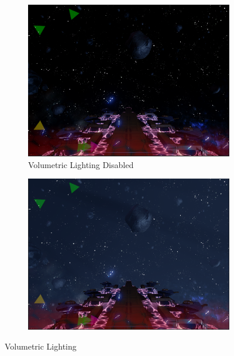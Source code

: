 \documentclass[a4paper,11pt]{article}
\begin{document}
\begin{figure}[ht]
	\centering
    
    \begin{subfigure}{.5\textwidth}
      \centering
      \includegraphics[width=.97\textwidth]{volumetricOff}
      \caption{Volumetric Lighting Disabled}
    \end{subfigure}%
    \begin{subfigure}{.5\textwidth}
    	\centering
		\includegraphics[width=.97\textwidth]{volumetricOn}
	\end{subfigure}
	\caption{Volumetric Lighting}
	\label{fig:volumetric}
\end{figure}

\clearpage
\end{document}
